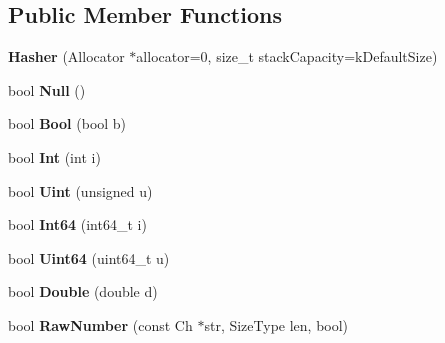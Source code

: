 \subsection*{Public Member Functions}
\begin{DoxyCompactItemize}
\item 
{\bfseries Hasher} (Allocator $\ast$allocator=0, size\+\_\+t stack\+Capacity=k\+Default\+Size)\hypertarget{classinternal_1_1_hasher_a7b6abfdd3bdc60064a2322cdd20708c1}{}\label{classinternal_1_1_hasher_a7b6abfdd3bdc60064a2322cdd20708c1}

\item 
bool {\bfseries Null} ()\hypertarget{classinternal_1_1_hasher_a57c656866aa08cc7c448ce47b7a243c3}{}\label{classinternal_1_1_hasher_a57c656866aa08cc7c448ce47b7a243c3}

\item 
bool {\bfseries Bool} (bool b)\hypertarget{classinternal_1_1_hasher_a11efd784a4e9c4f8a3dc281552df0486}{}\label{classinternal_1_1_hasher_a11efd784a4e9c4f8a3dc281552df0486}

\item 
bool {\bfseries Int} (int i)\hypertarget{classinternal_1_1_hasher_aadbadf98ee7c9ab03a636e0f06d38bac}{}\label{classinternal_1_1_hasher_aadbadf98ee7c9ab03a636e0f06d38bac}

\item 
bool {\bfseries Uint} (unsigned u)\hypertarget{classinternal_1_1_hasher_a4401600c24c817a45cea6c281438e5b4}{}\label{classinternal_1_1_hasher_a4401600c24c817a45cea6c281438e5b4}

\item 
bool {\bfseries Int64} (int64\+\_\+t i)\hypertarget{classinternal_1_1_hasher_ae0579cd54b3c545f77452543793b9a97}{}\label{classinternal_1_1_hasher_ae0579cd54b3c545f77452543793b9a97}

\item 
bool {\bfseries Uint64} (uint64\+\_\+t u)\hypertarget{classinternal_1_1_hasher_a14832ac4ec204f1065b929df2c255457}{}\label{classinternal_1_1_hasher_a14832ac4ec204f1065b929df2c255457}

\item 
bool {\bfseries Double} (double d)\hypertarget{classinternal_1_1_hasher_a83abe847e24ed88d5aab092d840e37c1}{}\label{classinternal_1_1_hasher_a83abe847e24ed88d5aab092d840e37c1}

\item 
bool {\bfseries Raw\+Number} (const Ch $\ast$str, Size\+Type len, bool)\hypertarget{classinternal_1_1_hasher_ae277289ad2fb3a938a6507e566d3c5e2}{}\label{classinternal_1_1_hasher_ae277289ad2fb3a938a6507e566d3c5e2}


\end{DoxyCompactItemize}
